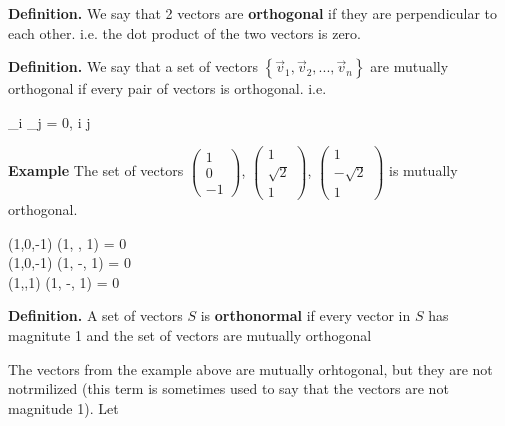 \documentclass{article}
\begin{document}
\textbf{Definition.} We say that 2 vectors are \textbf{orthogonal} if they are perpendicular to each other. i.e. the dot product of the two vectors is zero.

\textbf{Definition.} We say that a set of vectors $ \left\lbrace  \vec{v}_{1}, \vec{v}_{2}, ..., \vec{v}_{n} \right\rbrace $ are mutually orthogonal if every pair of vectors is orthogonal. i.e.

\beq \label{vectors_orthogonality}
_{i} \cdot {}_{j} = 0,  i \neq j
\eeq

\textbf{Example} The set of vectors
$\left(\begin{smallmatrix}1\\0\\-1\end{smallmatrix}\right)$,
$\left(\begin{smallmatrix}1\\\sqrt{2}\\1\end{smallmatrix}\right)$,
$\left(\begin{smallmatrix}1\\-\sqrt{2}\\1\end{smallmatrix}\right)$
is mutually orthogonal.

\beq
(1,0,-1) \cdot (1, , 1) = 0 \\
(1,0,-1) \cdot (1, -, 1) = 0 \\
(1,,1) \cdot (1, -, 1) = 0
\eeq


\textbf{Definition.} A set of vectors $S$ is \textbf{orthonormal} if every vector in $S$ has magnitute 1 and the set of vectors are mutually orthogonal


The vectors from the example above are mutually orhtogonal, but they are not notrmilized (this term is sometimes used to say that the vectors are not magnitude 1). Let
\end{document}
